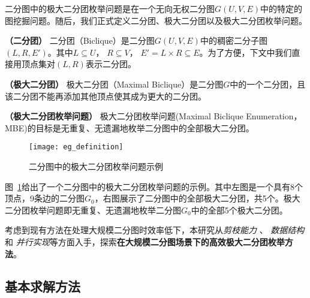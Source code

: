   二分图中的极大二分团枚举问题是在一个无向无权二分图$G(U,V,E)$中的特定的图挖掘问题。随后，我们正式定义二分团、极大二分团以及极大二分团枚举问题。

\begin{definition}
  \textbf{（二分团）} 二分团（Biclique）是二分图$G(U,V,E)$中的稠密二分子图$(L,R,E')$。其中$L\subseteq U$， $R\subseteq V$， $E' = L \times R \subseteq E$。为了方便，下文中我们直接用顶点集对$(L,R)$表示二分团。
\end{definition}

\begin{definition}
  \textbf{（极大二分团）} 极大二分团（Maximal Biclique）是二分图$G$中的一个二分团，且该二分团不能再添加其他顶点使其成为更大的二分团。
  \label{def:mb}
\end{definition}

\begin{definition}
  \textbf{（极大二分团枚举问题）} 极大二分团枚举问题(Maximal Biclique Enumeration， MBE)的目标是无重复、无遗漏地枚举二分图中的全部极大二分团。
\end{definition}

\begin{figure} [ht]
  \centering
  \texttt{[image: eg\_definition]}
  \vspace{0.1 in}
  \caption{二分图中的极大二分团枚举问题示例}
  \label{fig:eg_definition}
\end{figure}

\begin{example}
  图~\ref{fig:eg_definition}给出了一个二分图中的极大二分团枚举问题的示例。其中左图是一个具有8个顶点，9条边的二分图$G_0$，右图展示了二分图中的全部极大二分团，共5个。极大二分团枚举问题即无重复、无遗漏地枚举二分图$G_0$中的全部5个极大二分团。
  
\end{example}

考虑到现有方法在处理大规模二分图时效率低下，本研究从\emph{剪枝能力} 、 \emph{数据结构} 和 \emph{并行实现}等方面入手，探索\textbf{在大规模二分图场景下的高效极大二分团枚举方法}。





\subsection{基本求解方法}
\label{subsec:baseline}
  
